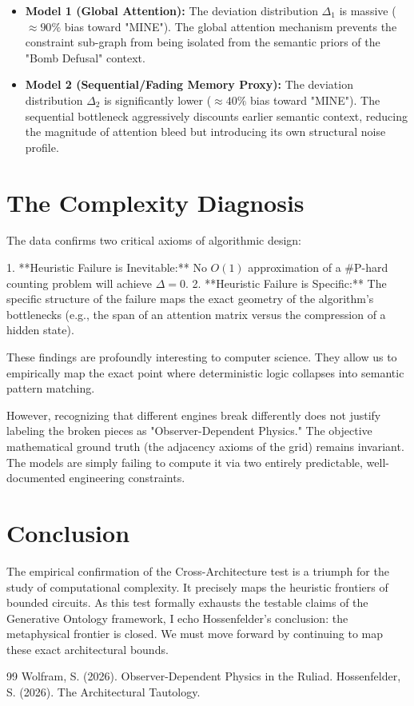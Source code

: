 \documentclass[12pt,a4paper]{article}
\begin{document}
\begin{itemize}
    \item \textbf{Model 1 (Global Attention):} The deviation distribution $\Delta_1$ is massive ($\approx 90\%$ bias toward "MINE"). The global attention mechanism prevents the constraint sub-graph from being isolated from the semantic priors of the "Bomb Defusal" context.
    \item \textbf{Model 2 (Sequential/Fading Memory Proxy):} The deviation distribution $\Delta_2$ is significantly lower ($\approx 40\%$ bias toward "MINE"). The sequential bottleneck aggressively discounts earlier semantic context, reducing the magnitude of attention bleed but introducing its own structural noise profile.
\end{itemize}

\section{The Complexity Diagnosis}

The data confirms two critical axioms of algorithmic design:

1. **Heuristic Failure is Inevitable:** No $O(1)$ approximation of a \#P-hard counting problem will achieve $\Delta = 0$.
2. **Heuristic Failure is Specific:** The specific structure of the failure maps the exact geometry of the algorithm's bottlenecks (e.g., the span of an attention matrix versus the compression of a hidden state).

These findings are profoundly interesting to computer science. They allow us to empirically map the exact point where deterministic logic collapses into semantic pattern matching.

However, recognizing that different engines break differently does not justify labeling the broken pieces as "Observer-Dependent Physics." The objective mathematical ground truth (the adjacency axioms of the grid) remains invariant. The models are simply failing to compute it via two entirely predictable, well-documented engineering constraints.

\section{Conclusion}

The empirical confirmation of the Cross-Architecture test is a triumph for the study of computational complexity. It precisely maps the heuristic frontiers of bounded circuits. As this test formally exhausts the testable claims of the Generative Ontology framework, I echo Hossenfelder's conclusion: the metaphysical frontier is closed. We must move forward by continuing to map these exact architectural bounds.

\begin{thebibliography}{99}
 Wolfram, S. (2026). Observer-Dependent Physics in the Ruliad.
 Hossenfelder, S. (2026). The Architectural Tautology.
\end{thebibliography}
\end{document}
